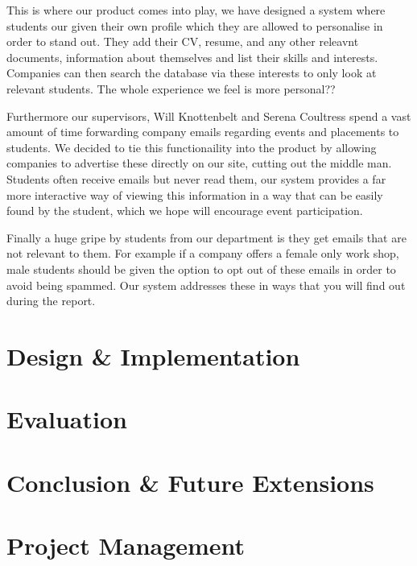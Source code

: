 \documentclass{article}
\begin{document}
This is where our product comes into play, we have designed a system where students our given their own profile which they are allowed to personalise in order to stand out. 
They add their CV, resume, and any other releavnt documents, information about themselves and list their skills and interests.
Companies can then search the database via these interests to only look at relevant students. The whole experience we feel is more personal??

Furthermore our supervisors, Will Knottenbelt and Serena Coultress spend a vast amount of time forwarding company emails regarding events and placements to students. We decided to tie this functionaility into the product by allowing companies to advertise these directly on our site, cutting out the middle man.
Students often receive emails but never read them, our system provides a far more interactive way of viewing this information in a way that can be easily found by the student, which we hope will encourage event participation.

Finally a huge gripe by students from our department is they get emails that are not relevant to them. For example if a company offers a female only work shop, male students should be given the option to opt out of these emails in order to avoid being spammed. Our system addresses these in ways that you will find out during the report.


\section{Design \& Implementation}
\section{Evaluation}
\section{Conclusion \& Future Extensions}
\section{Project Management}
\end{document}

